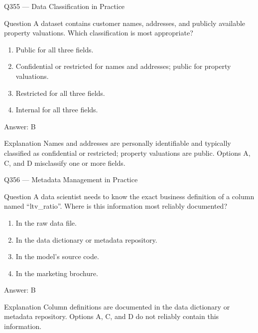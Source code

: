 \documentclass[aspectratio=169,8pt]{beamer}
\begin{document}
	\begin{frame}{Q355 --- Data Classification in Practice}
		\begin{block}{Question}
			A dataset contains customer names, addresses, and publicly available property valuations. Which classification is most appropriate?
			\begin{enumerate}
				\item Public for all three fields.
				\item Confidential or restricted for names and addresses; public for property valuations.
				\item Restricted for all three fields.
				\item Internal for all three fields.
			\end{enumerate}
		\end{block}
		\begin{exampleblock}{Answer: B}\end{exampleblock}
		\begin{block}{Explanation}
			Names and addresses are personally identifiable and typically classified as confidential or restricted; property valuations are public. Options A, C, and D misclassify one or more fields.
		\end{block}
	\end{frame}
	
	\begin{frame}{Q356 --- Metadata Management in Practice}
		\begin{block}{Question}
			A data scientist needs to know the exact business definition of a column named ``ltv\_ratio''. Where is this information most reliably documented?
			\begin{enumerate}
				\item In the raw data file.
				\item In the data dictionary or metadata repository.
				\item In the model's source code.
				\item In the marketing brochure.
			\end{enumerate}
		\end{block}
		\begin{exampleblock}{Answer: B}\end{exampleblock}
		\begin{block}{Explanation}
			Column definitions are documented in the data dictionary or metadata repository. Options A, C, and D do not reliably contain this information.
		\end{block}
	\end{frame}
	
\end{document}
